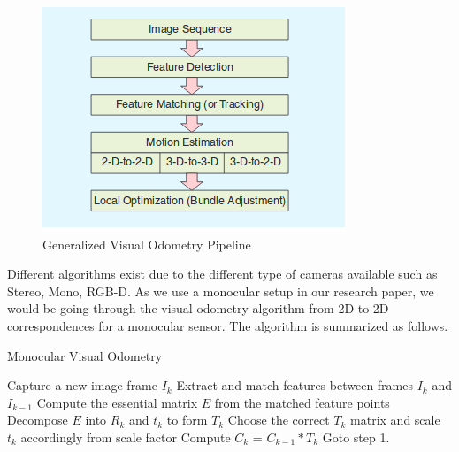 \begin{figure}[!htb]
  \includegraphics[width=\textwidth]{./figures/vo.png}
\caption{Generalized Visual Odometry Pipeline}
\label{fig:vo}       %
\end{figure}

Different algorithms exist due to the different type of cameras available such as Stereo, Mono, RGB-D. As we use a monocular setup in our research paper, we would be going through the visual odometry algorithm from 2D to 2D correspondences for a monocular sensor. The algorithm is summarized as follows.

\begin{algorithm}
    \caption{Monocular Visual Odometry}
	\begin{algorithmic}[1]
		\State Capture a new image frame $I_k$
    	\State Extract and match features between frames $I_k$ and $I_{k-1}$
    	\State Compute the essential matrix $E$ from the matched feature points
    	\State Decompose $E$ into $R_k$ and $t_k$ to form $T_k$
    	\State Choose the correct $T_k$ matrix and scale $t_k$ accordingly from scale factor
    	\State Compute $C_k$ = $C_{k-1}*T_k$
    	\State Goto step 1.
	\end{algorithmic}
\end{algorithm}

